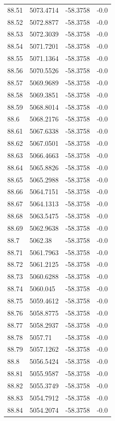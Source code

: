 \begin{table}[H]
\begin{tabular}{llll}
88.51 & 5073.4714 & -58.3758 & -0.0 \\
88.52 & 5072.8877 & -58.3758 & -0.0 \\
88.53 & 5072.3039 & -58.3758 & -0.0 \\
88.54 & 5071.7201 & -58.3758 & -0.0 \\
88.55 & 5071.1364 & -58.3758 & -0.0 \\
88.56 & 5070.5526 & -58.3758 & -0.0 \\
88.57 & 5069.9689 & -58.3758 & -0.0 \\
88.58 & 5069.3851 & -58.3758 & -0.0 \\
88.59 & 5068.8014 & -58.3758 & -0.0 \\
88.6 & 5068.2176 & -58.3758 & -0.0 \\
88.61 & 5067.6338 & -58.3758 & -0.0 \\
88.62 & 5067.0501 & -58.3758 & -0.0 \\
88.63 & 5066.4663 & -58.3758 & -0.0 \\
88.64 & 5065.8826 & -58.3758 & -0.0 \\
88.65 & 5065.2988 & -58.3758 & -0.0 \\
88.66 & 5064.7151 & -58.3758 & -0.0 \\
88.67 & 5064.1313 & -58.3758 & -0.0 \\
88.68 & 5063.5475 & -58.3758 & -0.0 \\
88.69 & 5062.9638 & -58.3758 & -0.0 \\
88.7 & 5062.38 & -58.3758 & -0.0 \\
88.71 & 5061.7963 & -58.3758 & -0.0 \\
88.72 & 5061.2125 & -58.3758 & -0.0 \\
88.73 & 5060.6288 & -58.3758 & -0.0 \\
88.74 & 5060.045 & -58.3758 & -0.0 \\
88.75 & 5059.4612 & -58.3758 & -0.0 \\
88.76 & 5058.8775 & -58.3758 & -0.0 \\
88.77 & 5058.2937 & -58.3758 & -0.0 \\
88.78 & 5057.71 & -58.3758 & -0.0 \\
88.79 & 5057.1262 & -58.3758 & -0.0 \\
88.8 & 5056.5424 & -58.3758 & -0.0 \\
88.81 & 5055.9587 & -58.3758 & -0.0 \\
88.82 & 5055.3749 & -58.3758 & -0.0 \\
88.83 & 5054.7912 & -58.3758 & -0.0 \\
88.84 & 5054.2074 & -58.3758 & -0.0 \\

\end{tabular}
\end{table}
